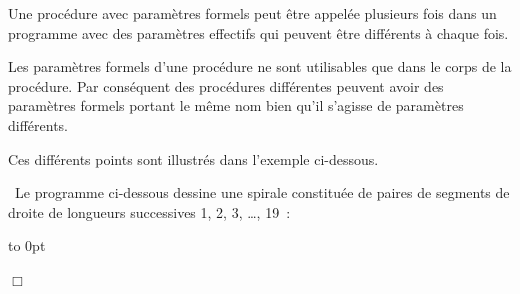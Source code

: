 Une procédure avec 
paramètres formels peut être appelée plusieurs fois dans un programme avec des 
pa\-ra\-mè\-tres effectifs
qui peuvent être différents à chaque fois.

Les paramètres formels d'une procédure ne sont utilisables que dans le
corps de la procédure. Par conséquent des procédures différentes peuvent avoir des
paramètres formels portant le même nom bien qu'il s'agisse de paramètres différents. 

Ces différents 
points sont illustrés dans l'exemple ci-dessous.

\begin{exemple}{\rm
~Le programme ci-dessous dessine une spirale constituée de paires de segments de droite
de longueurs successives 1, 2, 3, \ldots, 19~:

 {\raggedright 
 \vbox to 0pt{\vspace*{\baselineskip}\vspace*{4cm}
 }
 
 }
\noindent $\Box$ }\end{exemple}


